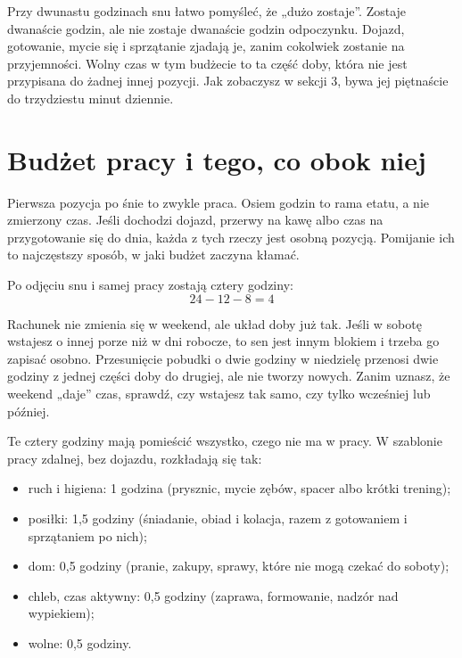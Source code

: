 \begin{falle}
Przy dwunastu godzinach snu łatwo pomyśleć, że „dużo zostaje”. Zostaje dwanaście godzin, ale nie zostaje dwanaście godzin odpoczynku. Dojazd, gotowanie, mycie się i sprzątanie zjadają je, zanim cokolwiek zostanie na przyjemności. Wolny czas w tym budżecie to ta część doby, która nie jest przypisana do żadnej innej pozycji. Jak zobaczysz w sekcji 3, bywa jej piętnaście do trzydziestu minut dziennie.
\end{falle}

\section{Budżet pracy i tego, co obok niej}

Pierwsza pozycja po śnie to zwykle praca. Osiem godzin to rama etatu, a nie zmierzony czas. Jeśli dochodzi dojazd, przerwy na kawę albo czas na przygotowanie się do dnia, każda z tych rzeczy jest osobną pozycją. Pomijanie ich to najczęstszy sposób, w jaki budżet zaczyna kłamać.

Po odjęciu snu i samej pracy zostają cztery godziny:
\[ 24 - 12 - 8 = 4 \]

Rachunek nie zmienia się w weekend, ale układ doby już tak. Jeśli w sobotę wstajesz o innej porze niż w dni robocze, to sen jest innym blokiem i trzeba go zapisać osobno. Przesunięcie pobudki o dwie godziny w niedzielę przenosi dwie godziny z jednej części doby do drugiej, ale nie tworzy nowych. Zanim uznasz, że weekend „daje” czas, sprawdź, czy wstajesz tak samo, czy tylko wcześniej lub później.

Te cztery godziny mają pomieścić wszystko, czego nie ma w pracy. W szablonie pracy zdalnej, bez dojazdu, rozkładają się tak:

\begin{itemize}
\item ruch i higiena: 1 godzina (prysznic, mycie zębów, spacer albo krótki trening);
\item posiłki: 1,5 godziny (śniadanie, obiad i kolacja, razem z gotowaniem i sprzątaniem po nich);
\item dom: 0,5 godziny (pranie, zakupy, sprawy, które nie mogą czekać do soboty);
\item chleb, czas aktywny: 0,5 godziny (zaprawa, formowanie, nadzór nad wypiekiem);
\item wolne: 0,5 godziny.
\end{itemize}

